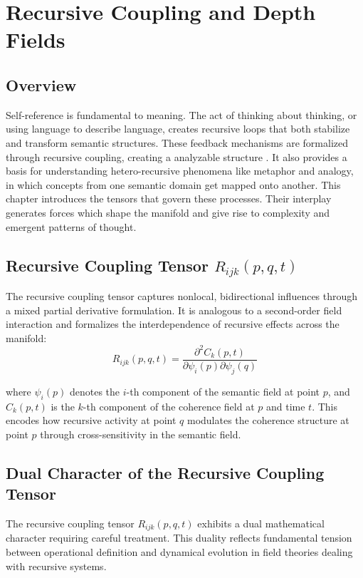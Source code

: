 \chapter{Recursive Coupling and Depth Fields}

\section{Overview}

Self-reference is fundamental to meaning. The act of thinking about thinking, or using language to describe language, creates recursive loops that both stabilize and transform semantic structures. These feedback mechanisms are formalized through recursive coupling, creating a analyzable structure \autocite{Barabasi2016}. It also provides a basis for understanding hetero-recursive phenomena like metaphor and analogy, in which concepts from one semantic domain get mapped onto another. This chapter introduces the tensors that govern these processes. Their interplay generates forces which shape the manifold and give rise to complexity and emergent patterns of thought.

\section{Recursive Coupling Tensor \(R_{ijk}(p, q, t)\)}

The recursive coupling tensor captures nonlocal, bidirectional influences through a mixed partial derivative formulation. It is analogous to a second-order field interaction and formalizes the interdependence of recursive effects across the manifold:
\begin{equation}
R_{ijk}(p, q, t) = \frac{\partial^2 C_k(p,t)}{\partial \psi_i(p) \partial \psi_j(q)}
\end{equation}

where \(\psi_i(p)\) denotes the \(i\)-th component of the semantic field at point \(p\), and \(C_k(p,t)\) is the \(k\)-th component of the coherence field at \(p\) and time \(t\). This encodes how recursive activity at point \(q\) modulates the coherence structure at point \(p\) through cross-sensitivity in the semantic field.

\section{Dual Character of the Recursive Coupling Tensor}

The recursive coupling tensor \(R_{ijk}(p, q, t)\) exhibits a dual mathematical character requiring careful treatment. This duality reflects fundamental tension between operational definition and dynamical evolution in field theories dealing with recursive systems.

